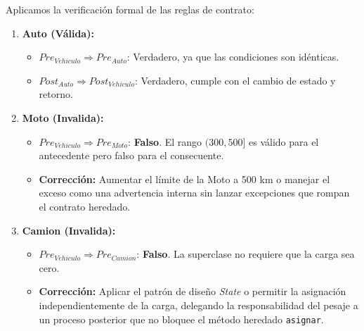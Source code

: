 Aplicamos la verificación formal de las reglas de contrato:
\begin{enumerate}
    \item \textbf{Auto (Válida):}
    \begin{itemize}
        \item $Pre_{Vehiculo} \Rightarrow Pre_{Auto}$: Verdadero, ya que las condiciones son idénticas.
        \item $Post_{Auto} \Rightarrow Post_{Vehiculo}$: Verdadero, cumple con el cambio de estado y retorno.
    \end{itemize}
    \item \textbf{Moto (Invalida):}
    \begin{itemize}
        \item $Pre_{Vehiculo} \Rightarrow Pre_{Moto}$: \textbf{Falso}. El rango $(300, 500]$ es válido para el antecedente pero falso para el consecuente.
        \item \textbf{Corrección:} Aumentar el límite de la Moto a 500 km o manejar el exceso como una advertencia interna sin lanzar excepciones que rompan el contrato heredado.
    \end{itemize}
    \item \textbf{Camion (Invalida):}
    \begin{itemize}
        \item $Pre_{Vehiculo} \Rightarrow Pre_{Camion}$: \textbf{Falso}. La superclase no requiere que la carga sea cero.
        \item \textbf{Corrección:} Aplicar el patrón de diseño \textit{State} o permitir la asignación independientemente de la carga, delegando la responsabilidad del pesaje a un proceso posterior que no bloquee el método heredado \texttt{asignar}.
    \end{itemize}
\end{enumerate}